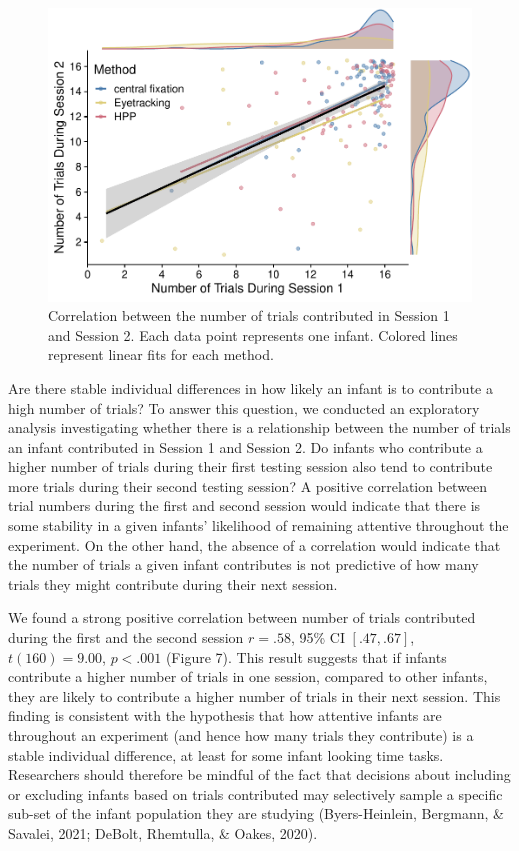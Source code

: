 \documentclass[
  man, donotrepeattitle,floatsintext]{apa6}
\begin{document}
\begin{figure}
\centering
\includegraphics{MB1T_supplement_files/figure-latex/sfig7-1.pdf}
\caption{\label{fig:sfig7}Correlation between the number of trials contributed in Session 1 and Session 2. Each data point represents one infant. Colored lines represent linear fits for each method.}
\end{figure}

Are there stable individual differences in how likely an infant is to contribute a high number of trials?
To answer this question, we conducted an exploratory analysis investigating whether there is a relationship between the number of trials an infant contributed in Session 1 and Session 2.
Do infants who contribute a higher number of trials during their first testing session also tend to contribute more trials during their second testing session?
A positive correlation between trial numbers during the first and second session would indicate that there is some stability in a given infants' likelihood of remaining attentive throughout the experiment.
On the other hand, the absence of a correlation would indicate that the number of trials a given infant contributes is not predictive of how many trials they might contribute during their next session.

We found a strong positive correlation between number of trials contributed during the first and the second session \(r = .58\), 95\% CI \([.47, .67]\), \(t(160) = 9.00\), \(p < .001\) (Figure 7).
This result suggests that if infants contribute a higher number of trials in one session, compared to other infants, they are likely to contribute a higher number of trials in their next session.
This finding is consistent with the hypothesis that how attentive infants are throughout an experiment (and hence how many trials they contribute) is a stable individual difference, at least for some infant looking time tasks.
Researchers should therefore be mindful of the fact that decisions about including or excluding infants based on trials contributed may selectively sample a specific sub-set of the infant population they are studying (Byers-Heinlein, Bergmann, \& Savalei, 2021; DeBolt, Rhemtulla, \& Oakes, 2020).
\end{document}
